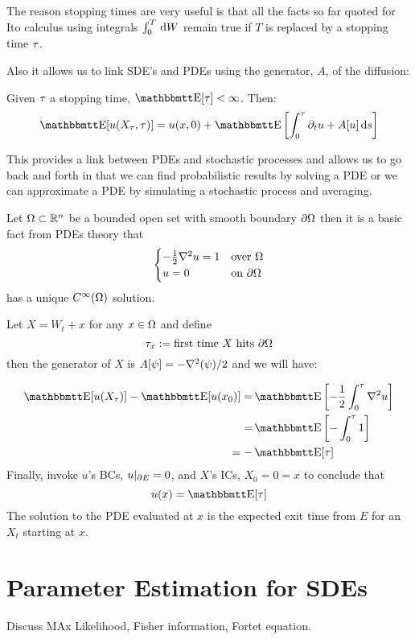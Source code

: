 The reason stopping times are very useful is that all the facts so far quoted
for Ito calculus using integrals $\int_0^T \, \mathrm{d} W$ remain true if $T$ is
replaced by a stopping time ${\tau}$.
 
Also it allows us to link SDE's and PDEs using the generator, $A$, of the
diffusion: 
\begin{thm} Given ${\tau}$ a stopping time, $\Exp[\t] < \infty$.
Then:
$$
\Exp[u(X_\t, \t)] =
u(x, 0) + \Exp\left[\int_0^\t \di_t u + A[u] \intd{s}
\right]
 $$
\end{thm}
This provides a link between PDEs and stochastic processes and allows us to go
back and forth in that we can find probabilistic results by
solving a PDE or we can approximate a PDE by simulating a stochastic process
and averaging.

\begin{ex}
\label{ex:mean_hitting_time}
 Let ${\Omega}
\subset { \mathbb{R} }^n$ be a bounded open set with smooth boundary ${\partial} {\Omega}$ then it is a
basic fact from PDEs theory that
\begin{equation}
\begin{cases}
-\frac{1}{2} { \nabla }^2 u = 1  & \text{over } {\Omega}
\\
u =  0 &\text{on } {\partial} {\Omega}
\end{cases}
\end{equation}
has a unique $C^\infty({\Omega})$ solution.

Let $X = W_t + x$ for any $x \in {\Omega}$ and define
 $${\tau}_x := \text{first time } X \text{ hits } {\partial} {\Omega}$$
then the generator of $X$ is $A[\psi] = -{ \nabla }^2(\psi)/2$ and we will
have:

\begin{align*}
\Exp[u(X_\t)] - \Exp[ u(x_0)] =& \Exp \left[ -\frac{1}{2}\int_0^\t \grad^2
u\right]
\\
=& \Exp \left[ - \int_0^\t 1
\right]
\\
=-&\Exp [\t]
\end{align*}
Finally, invoke $u$'s BCs, $u|_{{\partial} E} = 0$, and $X$'s ICs, $X_0=0 = x$ to
conclude that $$ u(x) = \Exp [\t]$$
The solution to the PDE evaluated at $x$ is the expected exit time from
$E$ for an $X_t$  starting at $x$.
\end{ex}

\section{Parameter Estimation for SDEs}
\label{sec:estimation}
Discuss MAx Likelihood, Fisher information, Fortet equation. 

